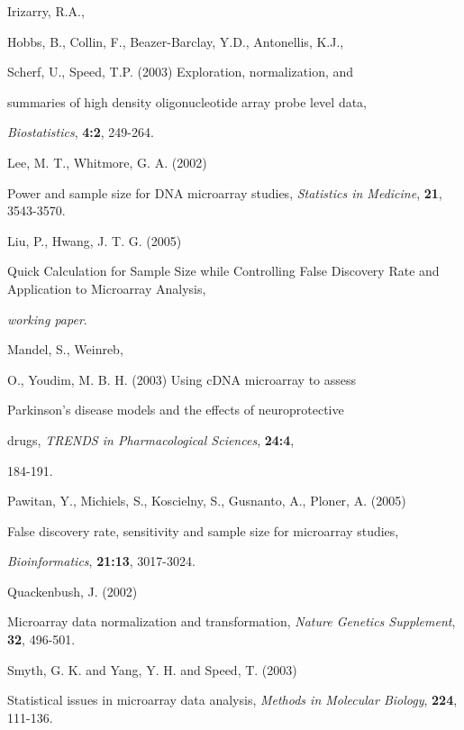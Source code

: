 \documentclass[12pt]{article}
\begin{document}
\begin{thebibliography}{}
 Irizarry, R.A.,

  Hobbs, B., Collin, F., Beazer-Barclay, Y.D., Antonellis, K.J.,

  Scherf, U., Speed, T.P. (2003) Exploration, normalization, and

  summaries of high density oligonucleotide array probe level data,

  {\it Biostatistics}, {\bf 4:2}, 249-264.



 Lee, M. T., Whitmore, G. A. (2002)

  Power and sample size for DNA microarray studies, {\it Statistics in Medicine}, {\bf 21}, 3543-3570.



 Liu, P., Hwang, J. T. G. (2005)

  Quick Calculation for Sample Size while Controlling False Discovery Rate and Application to Microarray Analysis,

  {\it working paper}.



 Mandel, S.,  Weinreb,

  O., Youdim, M. B. H. (2003) Using cDNA microarray to assess

  Parkinson's disease models and the effects of neuroprotective

  drugs, {\it TRENDS in Pharmacological Sciences}, {\bf 24:4},

  184-191.



 Pawitan, Y., Michiels, S., Koscielny, S., Gusnanto, A., Ploner, A. (2005)

  False discovery rate, sensitivity and sample size for microarray studies,

  {\it Bioinformatics}, {\bf 21:13}, 3017-3024.



 Quackenbush, J. (2002)

  Microarray data normalization and transformation, {\it Nature Genetics Supplement}, {\bf 32}, 496-501.



 Smyth, G. K. and Yang, Y. H. and Speed, T. (2003)

  Statistical issues in microarray data analysis, {\it Methods in Molecular Biology}, {\bf 224}, 111-136.




\end{thebibliography}
\end{document}
